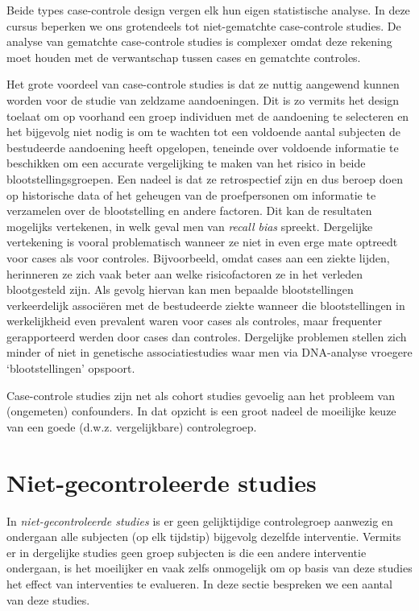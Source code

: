 \documentclass[
  12pt,dutch,coursenotes]{book}
\begin{document}
Beide types case-controle design vergen elk hun eigen statistische analyse.
In deze cursus beperken we ons grotendeels tot niet-gematchte case-controle studies. De
analyse van gematchte case-controle studies is complexer omdat deze rekening
moet houden met de verwantschap tussen cases en gematchte controles.

Het grote voordeel van case-controle studies is dat ze nuttig aangewend
kunnen worden voor de studie van zeldzame aandoeningen. Dit is zo vermits
het design toelaat om op voorhand een groep individuen met de aandoening te
selecteren en het bijgevolg niet nodig is om te wachten tot een voldoende
aantal subjecten de bestudeerde aandoening heeft opgelopen, teneinde over voldoende informatie te beschikken om een accurate vergelijking te maken van het risico in beide blootstellingsgroepen. Een nadeel is
dat ze retrospectief zijn en dus beroep doen op historische data of het
geheugen van de proefpersonen om informatie te verzamelen over de
blootstelling en andere factoren. Dit kan de resultaten mogelijks
vertekenen, in welk geval men van \emph{recall bias} spreekt. Dergelijke
vertekening is vooral problematisch wanneer ze niet in even erge mate
optreedt voor cases als voor controles. Bijvoorbeeld, omdat cases aan een
ziekte lijden, herinneren ze zich vaak beter aan welke risicofactoren ze in
het verleden blootgesteld zijn. Als gevolg hiervan kan men bepaalde
blootstellingen verkeerdelijk associëren met de bestudeerde ziekte wanneer
die blootstellingen in werkelijkheid even prevalent waren voor cases als
controles, maar frequenter gerapporteerd werden door cases dan controles. Dergelijke problemen stellen zich minder of niet in genetische associatiestudies waar men via DNA-analyse vroegere `blootstellingen' opspoort.

Case-controle studies zijn net als cohort studies gevoelig aan het probleem
van (ongemeten) confounders. In dat opzicht is een groot nadeel de moeilijke
keuze van een goede (d.w.z. vergelijkbare) controlegroep.

\hypertarget{niet-gecontroleerde-studies}{%
\section{Niet-gecontroleerde studies}\label{niet-gecontroleerde-studies}}

In \emph{niet-gecontroleerde studies} is er geen gelijktijdige controlegroep aanwezig en
ondergaan alle subjecten (op elk tijdstip) bijgevolg dezelfde interventie. Vermits er in
dergelijke studies geen groep subjecten is die een andere interventie
ondergaan, is het moeilijker en vaak zelfs onmogelijk om op basis van deze
studies het effect van interventies te evalueren. In deze sectie bespreken we een aantal van deze studies.
\end{document}
